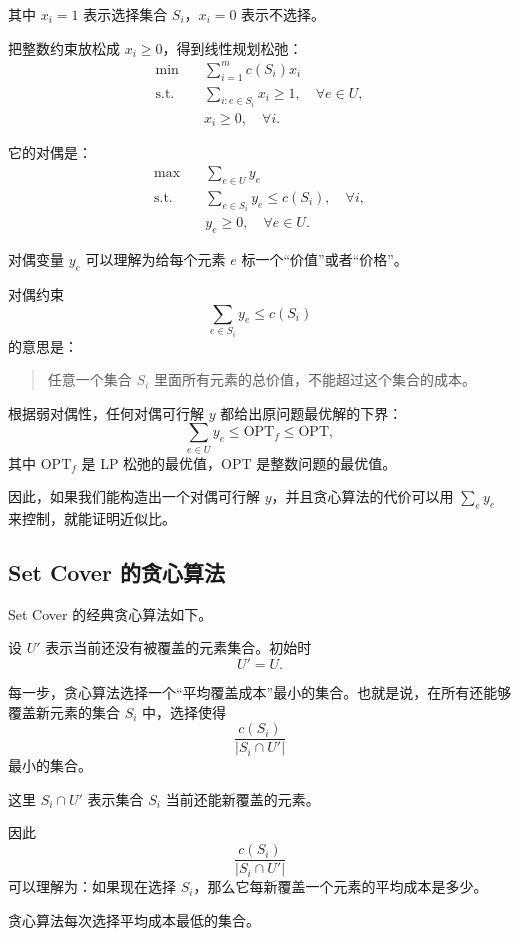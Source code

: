 \documentclass[UTF8,openany,12pt]{ctexbook}
\theoremstyle{remark}
\newcommand{\OPT}{\mathrm{OPT}}
\begin{document}
其中 $x_i=1$ 表示选择集合 $S_i$，$x_i=0$ 表示不选择。

把整数约束放松成 $x_i\ge 0$，得到线性规划松弛：
\[
\begin{aligned}
\min \quad & \sum_{i=1}^m c(S_i)x_i \\
\text{s.t.}\quad
& \sum_{i:e\in S_i} x_i \ge 1, \quad \forall e\in U,\\
& x_i\ge 0, \quad \forall i.
\end{aligned}
\]

它的对偶是：
\[
\begin{aligned}
\max \quad & \sum_{e\in U} y_e \\
\text{s.t.}\quad
& \sum_{e\in S_i} y_e \le c(S_i), \quad \forall i,\\
& y_e\ge 0, \quad \forall e\in U.
\end{aligned}
\]

对偶变量 $y_e$ 可以理解为给每个元素 $e$ 标一个“价值”或者“价格”。

对偶约束
\[
  \sum_{e\in S_i} y_e \le c(S_i)
\]
的意思是：

\begin{quote}
  任意一个集合 $S_i$ 里面所有元素的总价值，不能超过这个集合的成本。
\end{quote}

根据弱对偶性，任何对偶可行解 $y$ 都给出原问题最优解的下界：
\[
  \sum_{e\in U} y_e \le \OPT_f \le \OPT,
\]
其中 $\OPT_f$ 是 LP 松弛的最优值，$\OPT$ 是整数问题的最优值。

因此，如果我们能构造出一个对偶可行解 $y$，并且贪心算法的代价可以用
$\sum_e y_e$ 来控制，就能证明近似比。

\subsection{Set Cover 的贪心算法}

Set Cover 的经典贪心算法如下。

设 $U'$ 表示当前还没有被覆盖的元素集合。初始时
\[
  U'=U.
\]

每一步，贪心算法选择一个“平均覆盖成本”最小的集合。也就是说，在所有还能够覆盖新元素的集合 $S_i$ 中，选择使得
\[
  \frac{c(S_i)}{|S_i\cap U'|}
\]
最小的集合。

这里 $S_i\cap U'$ 表示集合 $S_i$ 当前还能新覆盖的元素。

因此
\[
  \frac{c(S_i)}{|S_i\cap U'|}
\]
可以理解为：如果现在选择 $S_i$，那么它每新覆盖一个元素的平均成本是多少。

贪心算法每次选择平均成本最低的集合。
\end{document}
